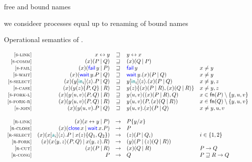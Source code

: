 free and bound names

we consideer processes equal up to renaming of bound names

\begin{table}
    \caption{Operational semantics of \Calculus.}
    \label{tab:semantics}
    \[
        \begin{array}{rrcll}
        \SLink &
        \Link\x\y & \pcong & \Link\y\x \\
        \SComm &
        \Cut\x{P}{Q} & \pcong & \Cut\x{Q}{P} \\
        \SFail &
        \Cut\x{\Fail\y}{P} & \pcong & \Fail\y & x \ne y \\
        \SWait &
        \Cut\x{\Wait\y.P}{Q} & \pcong & \Wait\y.\Cut\x{P}{Q} & x \ne y \\
        \SSelect &
        \Cut\x{\Select\y{\InTag_i}\z.P}{Q} & \pcong & \Select\y{\InTag_i}\z.\Cut\x{P}{Q} & x \ne y,z \\
        \SCase &
        \Cut\x{\Case\y\z{P}{Q}}{R} & \pcong & \Case\y\z{\Cut\x{P}{R}}{\Cut\x{Q}{R}} & x \ne y,z \\
        \SForkL &
        \Cut\x{\Fork\y\u\v{P}{Q}}{R} & \pcong & \Fork\y\u\v{\Cut\x{P}{R}}{Q} & x \in \fn{P}\setminus\set{y,u,v} \\
        \SForkR &
        \Cut\x{\Fork\y\u\v{P}{Q}}{R} & \pcong & \Fork\y\u\v{P}{\Cut\x{Q}{R}} & x \in \fn{Q}\setminus\set{y,u,v} \\
        \SJoin &
        \Cut\x{\Join\y\u\v.P}{Q} & \pcong & \Join\y\u\v.\Cut\x{P}{Q} & x \ne y,u,v \\
        \\
        \RLink &
        \Cut\x{\Link\x\y}{P} & \red & P\subst\y\x \\
        \RClose &
        \Cut\x{\Close\x}{\Wait\x.P} & \red & P \\
        \RSelect &
        \Cut\x{\Select\x{\Tag_i}\z.P}{\Case\x\z{Q_1}{Q_2}} & \red & \Cut\z{P}{Q_i} & i\in\set{1,2} \\
        \RFork &
        \Cut\x{\Fork\x\y\z{P}{Q}}{\Join\x\y\z.R} & \red & \Cut\y{P}{\Cut\z{Q}{R}} \\
        \RCut &
        \Cut\x{P}{R} & \red & \Cut\x{Q}{R} & P \red Q \\
        \RCong &
        P & \red & Q & P \pcong R \red Q \\
        \end{array}
    \]
\end{table}


